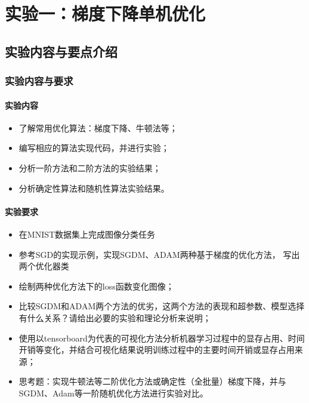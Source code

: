 \chapter{实验一：梯度下降单机优化}\label{chapter:task1}

\section{实验内容与要点介绍}

\subsection{实验内容与要求}

\subsubsection{实验内容}
\begin{itemize}
    \item 了解常用优化算法：梯度下降、牛顿法等；
    \item 编写相应的算法实现代码，并进行实验；
    \item 分析一阶方法和二阶方法的实验结果；
    \item 分析确定性算法和随机性算法实验结果。
\end{itemize}

\subsubsection{实验要求}
\begin{itemize}
    \item 在MNIST数据集上完成图像分类任务
    \item 参考SGD的实现示例，实现SGDM、ADAM两种基于梯度的优化方法， 写出两个优化器类
    \item 绘制两种优化方法下的loss函数变化图像；
    \item 比较SGDM和ADAM两个方法的优劣，这两个方法的表现和超参数、模型选择有什么关系？请给出必要的实验和理论分析来说明；
    \item 使用以tensorboard为代表的可视化方法分析机器学习过程中的显存占用、时间开销等变化，并结合可视化结果说明训练过程中的主要时间开销或显存占用来源；
    \item 思考题：实现牛顿法等二阶优化方法或确定性（全批量）梯度下降，并与SGDM、Adam等一阶随机优化方法进行实验对比。
\end{itemize}

